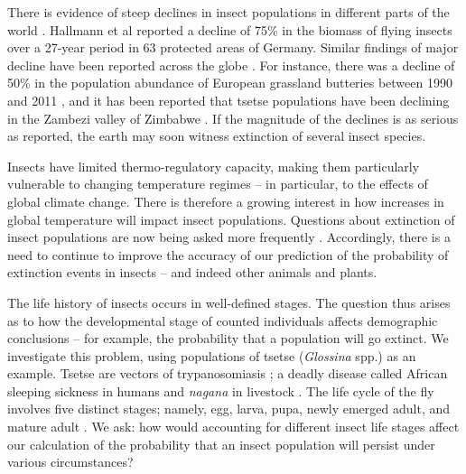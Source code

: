 \documentclass[smallextended]{svjour3}
\begin{document}
There is evidence of steep declines in insect populations in different parts of the world \cite{Conrad2002,Potts2010,Ilyinykh2011,VanSwaay2013,Lister2018}. Hallmann et al \cite{Hallmann2017} reported a decline of 75\% in the biomass of flying insects over a 27-year period in 63 protected areas of Germany. Similar findings of major decline have been reported across the globe \cite{Habel2015,Pelton2019}. For instance, there was a decline of 50\% in the population abundance of European grassland butteries between 1990 and 2011 \cite{VanSwaay2013}, and it has been reported that tsetse populations have been declining in the Zambezi valley of Zimbabwe \cite{Lord2018}. If the magnitude of the declines is as serious as reported, the earth may soon witness extinction of several insect species. 

Insects have limited thermo-regulatory capacity, making them particularly vulnerable to changing temperature regimes – in particular, to the effects of global climate change. There is therefore a growing interest in how increases in global temperature will impact insect populations. Questions about extinction of insect populations are now being asked more frequently \cite{Nilsson2017}. Accordingly, there is a need to continue to improve the accuracy of our prediction of the probability of extinction events in insects – and indeed other animals and plants. 

The life history of insects occurs in well-defined stages. The question thus arises as to how the developmental stage of counted individuals affects demographic conclusions – for example, the probability that a population will go extinct.  We investigate this problem, using populations of tsetse (\textit{Glossina} spp.) as an example. Tsetse are vectors of trypanosomiasis \cite{Wamwiri2016,Kioy2004}; a deadly disease called African sleeping sickness in humans and \textit{nagana} in livestock \cite{Kioy2004}. The life cycle of the fly involves five distinct stages; namely, egg, larva, pupa, newly emerged adult, and mature adult \cite{Ackley2017a}. We ask: how would accounting for different insect life stages affect our calculation of the probability that an insect population will persist under various circumstances? 
\end{document}
